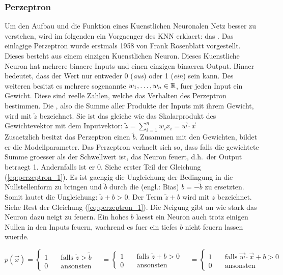 \documentclass[../main]{subfiles}
\begin{document}
\subsubsection{Perzeptron}
Um den Aufbau und die Funktion eines Kuenstlichen Neuronalen Netz besser zu
verstehen, wird im folgenden ein Vorgaenger des KNN erklaert: das .
\para{}
Das einlagige Perzeptron wurde erstmals 1958 von Frank Rosenblatt vorgestellt. Dieses
besteht aus einem einzigen Kuenstlichen Neuron. Dieses Kuenstliche Neuron
hat mehrere binaere Inputs und einen einzigen binaeren Output. Binaer
bedeutet, dass der Wert nur entweder 0 (\textit{aus}) oder 1 (\textit{ein}) sein
kann. Des weiteren besitzt es mehrere sogenannte  $w_1, \ldots,
w_n \in \mathbb{R}$, fuer jeden Input ein Gewicht.
Diese sind reelle Zahlen, welche das Verhalten des Perzeptron bestimmen.
Die , also die Summe aller Produkte der Inputs mit
ihrem Gewicht, wird mit $\tilde{z}$ bezeichnet.
Sie ist das gleiche wie das Skalarprodukt des Gewichtevektor mit dem Inputvektor:
$\displaystyle \tilde{z} = \sum_{i=1}^{n} w_i x_i = \vec{w} \cdot \vec{x}$\\
Zusaetzlich besitzt das Perzeptron einen  $\tilde{b}$.
Zusammen mit den Gewichten, bildet er die Modellparameter.
Das Perzeptron verhaelt sich so, dass falls die gewichtete Summe groesser als der
Schwellwert ist, das Neuron feuert, d.h.\ der Output betraegt 1. Andernfalls ist er 0.
Siehe erster Teil der Gleichung (\ref{eq:perzeptron_1}).
Es ist gaengig die Ungleichung der Bedingung in die Nullstellenform zu bringen
und $\tilde{b}$ durch die  (engl.: Bias)
$b = -\tilde{b}$ zu ersetzten. Somit lautet die Ungleichung: $\tilde{z} + b
> 0$. Der Term $\tilde{z} + b$ wird mit $z$ bezeichnet. Siehe Rest der Gleichung (\ref{eq:perzeptron_1}).
Die Neigung gibt an wie stark das Neuron dazu neigt zu feuern. Ein hohes $b$
laesst ein Neuron auch trotz einigen Nullen in den Inputs feuern, waehrend es
fuer ein tiefes $b$ nicht feuern lassen wuerde.

\begin{equation}\label{eq:perzeptron_1}
  p(\vec{x}) =
  \begin{cases}
    1 & \quad \text{falls } \tilde{z} > \tilde{b}\\
    0 & \quad \text{ansonsten}
  \end{cases}
  \quad =
  \begin{cases}
    1 & \quad \text{falls } \tilde{z} + b > 0\\
    0 & \quad \text{ansonsten}
  \end{cases}
  \quad =
  \begin{cases}
    1 & \quad\text{falls } \vec{w} \cdot \vec{x} + b > 0\\
    0 & \quad\text{ansonsten}
  \end{cases}
\end{equation}
\end{document}
